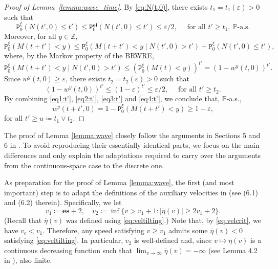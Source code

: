 \documentclass[12pt,reqno,oneside]{amsart}
\numberwithin{equation}{section}
\theoremstyle{definition}
\theoremstyle{remark}
\newcommand{\Z}{\mathbb{Z}}
\newcommand{\PP}{\mathbb{P}}
\newcommand{\es}{\mathbf{es}}
\newcommand{\ei}{\mathbf{ei}}
\begin{document}
\begin{proof}[Proof of Lemma~\ref{lemma:wave_time}]
  By \eqref{eq:N(t,0)}, there exists $t_1=t_1(\varepsilon)>0$ such that
  \begin{equation}\label{eq1:t'}
    \mathtt{P}_0^\xi(N(t',0) \leq t')
    \leq \mathtt{P}_0^\ei(N(t',0) \leq t')
    \leq \varepsilon/2,
    \quad \text{ for all } t' \geq t_1, \ \PP\text{-a.s.}
  \end{equation}
  Moreover, for all $y \in \Z$,
  \begin{equation}\label{eq2:t'}
    \mathtt{P}_0^\xi(M(t+t') <y)
    \leq \mathtt{P}_0^\xi(M(t+t') <y \mid N(t',0) > t')
    + \mathtt{P}_0^\xi(N(t',0) \leq t'),
  \end{equation}
  where, by the Markov property of the BRWRE,
  \begin{equation}\label{eq3:t'}
    \mathtt{P}_0^\xi(M(t+t') <y \mid N(t',0) > t')
    \leq (\mathtt{P}_0^\xi(M(t) <y))^{t'} = (1-w^y(t,0))^{t'}.
  \end{equation}
  Since $w^y(t,0) \geq \varepsilon$, there exists $t_2=t_2(\varepsilon)>0$ such that
  \begin{equation}\label{eq4:t'}
    (1-w^y(t,0))^{t'} \leq(1-\varepsilon)^{t'}
    \leq \varepsilon/2, \quad \text{ for all } t' \geq t_2.
  \end{equation}
  By combining \eqref{eq1:t'}, \eqref{eq2:t'}, \eqref{eq3:t'} and
  \eqref{eq4:t'}, we conclude that, $\PP$-a.s.,
  \begin{equation*}
      w^y(t+t',0)=1-\mathtt{P}_0^\xi(M(t+t') <y) \geq 1- \varepsilon,
  \end{equation*}
  for all $t' \geq u\coloneq t_1 \vee t_2$.
\end{proof}

The proof of Lemma \ref{lemma:wave} closely follow the arguments in Sections
5 and 6 in \cite{CDO25}. To avoid reproducing their essentially identical
parts, we focus on the main differences and only explain the adaptations
required to carry over the arguments from the continuous-space case to the
discrete one.

As preparation for the proof of Lemma \ref{lemma:wave}, the first (and most important) step is to adapt the definitions of the auxiliary velocities in \cite{CDO25} (see (6.1) and (6.2) therein). Specifically, we let
  \begin{equation}\label{eq:def_v_1}
    v_1\coloneq \es +2, \quad v_2\coloneq\inf\{v > v_1+1: |\overline{\eta}(v)| \geq 2v_1+2\}.
  \end{equation}
  (Recall that $\overline{\eta}(v)$ was defined using \eqref{eq:veltilting}.) Note that, by \eqref{eq:velcrit}, we have $v_c < v_1$. Therefore, any speed
  satisfying $v\geq v_1$ admits some $\overline{\eta}(v)<0$ satisfying
  \eqref{eq:veltilting}. In particular, $v_2$ is well-defined and, since
  $v \mapsto \overline{\eta}(v)$ is a continuous decreasing function such
  that $\lim_{v \rightarrow \infty} \overline{\eta}(v)=-\infty$ (see Lemma 4.2 in \cite{CD20}), also finite.
\end{document}
